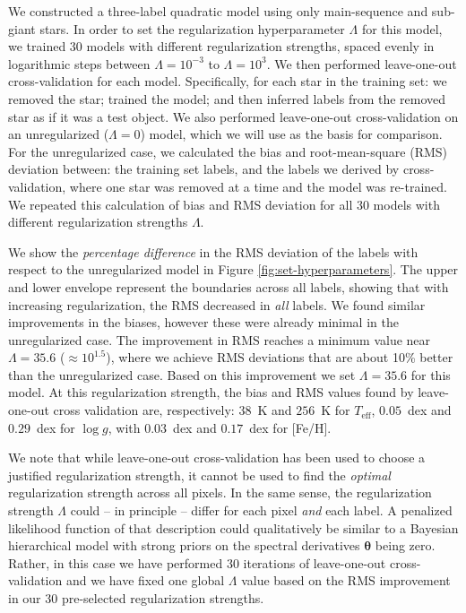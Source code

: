 \documentclass[preprint]{aastex61}
\newcommand{\teff}{T_{\mathrm{eff}}}
\newcommand{\logg}{\log g}
\newcommand{\Dvector}[1]{\boldsymbol{#1}}
\newcommand{\vectheta}{\Dvector{\theta}}
\begin{document}
We constructed a three-label quadratic model using only main-sequence and sub-giant
stars. In order to set the regularization hyperparameter $\Lambda$ for this model, we 
trained 30 models with different regularization strengths, spaced evenly in logarithmic
steps between $\Lambda = 10^{-3}$ to $\Lambda = 10^{3}$.  We then performed leave-one-out 
cross-validation for each model.  Specifically, for each star in the training set: we 
removed the star; trained the model; and then inferred labels from the removed star as 
if it was a test object.  We also performed leave-one-out cross-validation on an 
unregularized ($\Lambda = 0$) model, which we will use as the basis for comparison.  
For the unregularized case, we calculated the bias and root-mean-square (RMS) deviation 
between: the training set labels, and the labels we derived by cross-validation, where 
one star was removed at a time and the model was re-trained.  We repeated this calculation
of bias and RMS deviation for all 30 models with different regularization strengths $\Lambda$. 


We show the \emph{percentage difference} in the RMS deviation of the labels with respect
to the unregularized model in Figure \ref{fig:set-hyperparameters}.  The upper 
and lower envelope represent the boundaries across all labels, showing that with increasing
regularization, the RMS decreased in \emph{all} labels.  We found similar
improvements in the biases, however these were already minimal in the unregularized
case.  The improvement in RMS reaches a minimum value near 
$\Lambda = 35.6$ ($\approx10^{1.5}$), where
we achieve RMS deviations that are about 10\% better than the unregularized case.
Based on this improvement we set $\Lambda = 35.6$ for this model.  At this regularization 
strength, the bias and RMS values found by leave-one-out
cross validation are, respectively: $38$~K and $256$~K for $\teff$, $0.05$~dex and 
$0.29$~dex for $\logg$, with $0.03$~dex and $0.17$~dex for [Fe/H].


We note that while leave-one-out cross-validation has been used to choose a justified
regularization strength, it cannot be used to find the \emph{optimal} regularization
strength across all pixels. In the same sense, the regularization strength $\Lambda$
could -- in principle -- differ for each pixel \emph{and} each label. A penalized
likelihood function of that description could qualitatively be similar to a
Bayesian hierarchical model with strong priors on the spectral derivatives $\vectheta$ being
zero. Rather, in this case we have performed 30 iterations of leave-one-out
cross-validation and we have fixed one global $\Lambda$ value based on the RMS 
improvement in our 30 pre-selected regularization strengths.
\end{document}
